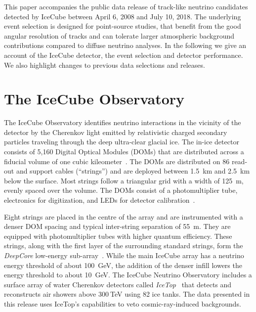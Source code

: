 \documentclass[aps,10pt,prd,twocolumn,floats,letterpaper,showpacs,nofootinbib,bibnotes,notitlepage,superscriptaddress,floatfix]{revtex4-1}
\begin{document}
This paper accompanies the public data release of track-like neutrino candidates detected by IceCube between April 6, 2008 and July 10, 2018. The underlying event selection is designed for point-source studies, that benefit from the good angular resolution of tracks and can tolerate larger atmospheric background contributions compared to diffuse neutrino analyses. In the following we give an account of the IceCube detector, the event selection and detector performance. We also highlight changes to previous data selections and releases.

\section{The IceCube Observatory}

The IceCube Observatory identifies neutrino interactions in the vicinity of the detector by the Cherenkov light emitted by relativistic charged secondary particles traveling through the deep ultra-clear glacial ice. The in-ice detector consists of 5,160 Digital Optical Modules (DOMs) that are distributed across a fiducial volume of one cubic kileometer~\cite{Abbasi:2008aa, Abbasi:2010vc}. The DOMs are distributed on 86 read-out and support cables (``strings'') and are deployed between 1.5~km and 2.5~km below the surface. Most strings follow a triangular grid with a width of 125~m, evenly spaced over the volume. The DOMs consist of a photomultiplier tube, electronics for digitization, and LEDs for detector calibration~\cite{Abbasi:2008aa, Abbasi:2010vc}.

Eight strings are placed in the centre of the array and are instrumented with a denser DOM spacing and typical inter-string separation of 55~m. They are equipped with photomultiplier tubes with higher quantum efficiency. These strings, along with the first layer of the surrounding standard strings, form the \emph{DeepCore} low-energy sub-array~\cite{Collaboration:2011ym}. While the main IceCube array has a neutrino energy threshold of about 100~GeV, the addition of the denser infill lowers the energy threshold to about 10~GeV. The IceCube Neutrino Observatory includes a surface array of water Cherenkov detectors called \emph{IceTop}~\cite{IceCube:2012nn} that detects and reconstructs air showers above $300\:$TeV using 82 ice tanks. The data presented in this release uses IceTop's capabilities to veto cosmic-ray-induced backgrounds.
\end{document}

